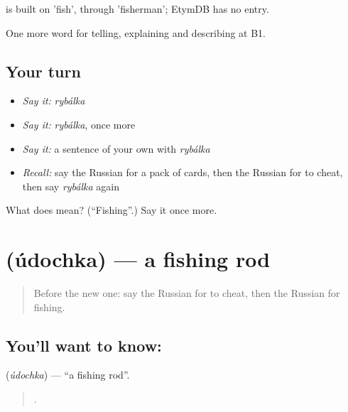 \begin{cousinweb}
\emph{} is built on \emph{} 'fish', through \emph{} 'fisherman'; EtymDB has no entry.
\end{cousinweb}

\begin{grammarlens}[title={What you've built}]
One more word for telling, explaining and describing at B1.
\end{grammarlens}

\subsection*{Your turn}
\begin{itemize}
\raggedright
  \item \emph{Say it:} \emph{rybálka}
  \item \emph{Say it:} \emph{rybálka}, once more
  \item \emph{Say it:} a sentence of your own with \emph{rybálka}
  \item \emph{Recall:} say the Russian for a pack of cards, then the Russian for to cheat, then say \emph{rybálka} again
\end{itemize}

\begin{tcolorbox}[breakable,colback=teal!4,colframe=teal!35!black,title={Before you move on}]
What does  mean? (\textquotedblleft{}Fishing\textquotedblright{}.) Say it once more.
\end{tcolorbox}
\section[\texorpdfstring{\ru{удочка} (údochka)}{удочка (údochka)}]{ (údochka) — a fishing rod}

\label{lesson:RU-C505-udochka}



\begin{quote}
Before the new one: say the Russian for to cheat, then the Russian for fishing.
\end{quote}

\subsection*{You'll want to know: }
\textbf{} (\emph{údochka}) — \textquotedblleft{}a fishing rod\textquotedblright{}.

\begin{quote}
      .
\end{quote}

